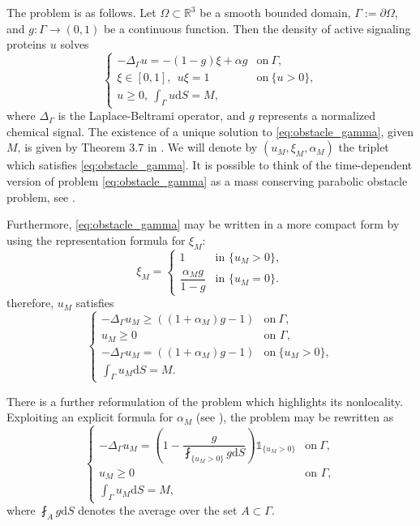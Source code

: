 \documentclass[10pt,a4paper]{article}
\newcommand{\RR}{\mathbb{R}}
\numberwithin{equation}{section}
\begin{document}
The problem is as follows. Let $\Omega \subset \RR^3$ be a smooth bounded domain, $\Gamma:= \partial \Omega$, and $ g:\Gamma \rightarrow (0,1) $ be a continuous function. Then the density of active signaling proteins $ u $ solves 
\begin{equation}
\label{eq:obstacle_gamma}
\begin{cases}
	-\Delta_{\Gamma} u = -(1-g)\xi + \alpha g & \mathrm{on} ~ \Gamma, \\ 
	\xi \in [0,1],~~u \xi  = 1 & \mathrm{on}~ \{u>0\},\\
	u\geq 0,~ \displaystyle\int_{\Gamma} u \mathrm{d}S = M,
\end{cases}
\end{equation}
where $\Delta_{\Gamma}$ is the Laplace-Beltrami operator, and $ g $ represents a normalized chemical signal. The existence of a unique solution to \eqref{eq:obstacle_gamma}, given $M$, is given by Theorem 3.7 in \cite{NRV20}. We will denote by $(u_M, \xi_M, \alpha_M)$ the triplet which satisfies \eqref{eq:obstacle_gamma}. It is possible to think of the time-dependent version of problem \eqref{eq:obstacle_gamma} as a mass conserving parabolic obstacle problem, see \cite{LNRV23}.

Furthermore, \eqref{eq:obstacle_gamma} may be written in a more compact form by using the representation formula for $ \xi_M $:
\[
	\xi_M = \begin{cases}
		1			& \text{in }\{ u_M > 0 \},\\
		\dfrac{\alpha_M g}{1-g} & \text{in }\{ u_M = 0 \}.
	\end{cases}
\]
therefore, $ u_M $ satisfies
\[
\begin{cases}
	-\Delta_{\Gamma} u_M \geq ((1+\alpha_M)g - 1) & \mathrm{on} ~ \Gamma, \\ 
	u_M \geq 0 & \text{on }\Gamma, \\
	-\Delta_{\Gamma} u_M = ((1+\alpha_M)g - 1)& \mathrm{on} ~ \{u_M > 0\},\\
	\displaystyle\int_{\Gamma} u_M \mathrm{d}S = M.
\end{cases}
\]

There is a further reformulation of the problem which highlights its nonlocality. Exploiting an explicit formula for $\alpha_M$ (see \cite{LNRV21}), the problem may be rewritten as
\[
\begin{cases}
	-\Delta_{\Gamma} u_M = \left(1 - \dfrac{g}{\fint_{\{u_M > 0\}} g \mathrm{d}S}\right) \mathbb{1}_{\{u_M > 0 \}}& \mathrm{on} ~ \Gamma, \\ 
	u_M \geq 0 & \text{on }\Gamma, \\
	\displaystyle\int_{\Gamma} u_M \mathrm{d}S = M,
\end{cases}
\]
where $\fint_A g \mathrm{d}S$ denotes the average over the set $A\subset \Gamma$.
\end{document}

